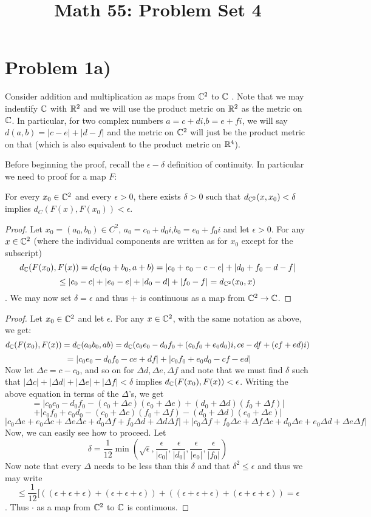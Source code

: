 \title{Math 55: Problem Set 4}

\maketitle
\section*{Problem 1a)}
Consider addition and multiplication as maps from $\mathbb{C}^2$ to $\mathbb{C}$ . Note that we may indentify $\mathbb{C}$ with $\mathbb{R}^2$ and we will use the product metric on $\mathbb{R}^2$ as the metric on $\mathbb{C}$. In particular, for two complex numbers $a=c+di$,$b=e+fi$, we will say $d(a,b) = |c-e| + |d-f|$ and the metric on $\mathbb{C}^2$ will just be the product metric on that (which is also equivalent to the product metric on $\mathbb{R}^4$).  \par 
Before beginning the proof, recall the $\epsilon-\delta$ definition of continuity. In particular we need to proof for a map $F$: \par 
For every $x_0 \in \mathbb{C}^2$ and every $\epsilon>0$, there exists $\delta>0$ such that $d_{\mathbb{C}^2}(x,x_0)<\delta$ implies $d_{C}(F(x),F(x_0))<\epsilon$. \par
{} 
\begin{proof}
Let $x_0=(a_0,b_0)\in C^2$, $a_0=c_0+d_0i$,$b_0=e_0+f_0i$ and let $\epsilon>0$. 
For any $x\in \mathbb{C}^2$ (where the individual components are written as for $x_0$ except for the subscript)
\[ d_{\mathbb{C}}(F(x_0),F(x))=d_{\mathbb{C}}(a_0+b_0, a+b) = |c_0+e_0-c-e| + |d_0+f_0-d-f| \]\[\leq |c_0-c| + |e_0-e| + |d_0-d| + |f_0-f| = d_{\mathbb{C}^2}(x_0,x) \].
We may now set $\delta = \epsilon$ and thus $+$ is continuous as a map from $\mathbb{C}^2\to \mathbb{C}$.
\end{proof}
\begin{proof}
Let $x_0\in \mathbb{C}^2$ and let $\epsilon$. For any $x\in \mathbb{C}^2$, with the same notation as above, we get:
\[ d_{\mathbb{C}}(F(x_0), F(x)) = d_{\mathbb{C}}(a_0b_0, ab) = d_{\mathbb{C}}(c_0e_0-d_0f_0+(c_0f_0+e_0d_0)i,ce-df+(cf+ed)i) \]
\[ = |c_0e_0-d_0f_0-ce+df| + |c_0f_0+e_0d_0-cf-ed| \] 
Now let $\Delta c = c-c_0$, and so on for $\Delta d,\Delta e,\Delta f$ and note that we must find $\delta$
such that $|\Delta c| + |\Delta d| + |\Delta e| + |\Delta f|< \delta$ implies $d_{\mathbb{C}}(F(x_0), F(x))<\epsilon$. Writing the above equation in terms of the $\Delta$'s, we get
\[ = |c_0e_0-d_0f_0-(c_0+\Delta c)(e_0+\Delta e)+(d_0+\Delta d)(f_0+\Delta f)|\]\[ +
|c_0f_0+e_0d_0-(c_0+\Delta c)(f_0+\Delta f)-(d_0+\Delta d)(e_0+\Delta e)| \]
 \[ |c_0\Delta e + e_0\Delta c+ \Delta e\Delta c + d_0\Delta f + f_0\Delta d+ \Delta d\Delta f| + |c_0\Delta f + f_0\Delta c+ \Delta f\Delta c + d_0\Delta e + e_0\Delta d+ \Delta e\Delta f| \]
 Now, we can easily see how to proceed. Let
 \[ \delta = \frac{1}{12}\min(\sqrt{\epsilon}, \frac{\epsilon}{|c_0|}, \frac{\epsilon}{|d_0|}, \frac{\epsilon}{|e_0|}, \frac{\epsilon}{|f_0|}) \]
 Now note that every $\Delta$ needs to be less than this $\delta$ and that $\delta^2\leq \epsilon$ and thus we may write 
 \[
 \leq \frac{1}{12}[((\epsilon+\epsilon+\epsilon)+(\epsilon+\epsilon+\epsilon))+((\epsilon+\epsilon+\epsilon)+(\epsilon+\epsilon+\epsilon))
 =\epsilon\].
 Thus $\cdot$ as a map from $\mathbb{C}^2$ to $\mathbb{C}$ is continuous. 
\end{proof}
